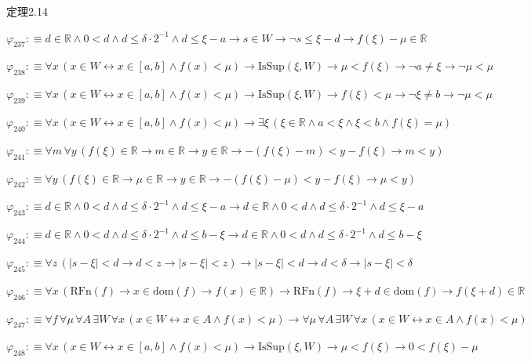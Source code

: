 \begin{fullproof}{定理2.14}
\begin{abbrevlist}
\item $\varphi_{237} :\equiv d \in \mathbb{R} \land 0 < d \land d \leq \delta \cdot 2^{-1} \land d \leq \xi - a \to s \in W \to \neg s \leq \xi - d \to f(\xi) - \mu \in \mathbb{R}$
\item $\varphi_{238} :\equiv \forall x\,(x \in W \leftrightarrow x \in [a,b] \land f(x) < \mu) \to \mathrm{IsSup}(\xi,W) \to \mu < f(\xi) \to \neg a \neq \xi \to \neg \mu < \mu$
\item $\varphi_{239} :\equiv \forall x\,(x \in W \leftrightarrow x \in [a,b] \land f(x) < \mu) \to \mathrm{IsSup}(\xi,W) \to f(\xi) < \mu \to \neg \xi \neq b \to \neg \mu < \mu$
\item $\varphi_{240} :\equiv \forall x\,(x \in W \leftrightarrow x \in [a,b] \land f(x) < \mu) \to \exists \xi\,(\xi \in \mathbb{R} \land a < \xi \land \xi < b \land f(\xi) = \mu)$
\item $\varphi_{241} :\equiv \forall m\,\forall y\,(f(\xi) \in \mathbb{R} \to m \in \mathbb{R} \to y \in \mathbb{R} \to -(f(\xi) - m) < y - f(\xi) \to m < y)$
\item $\varphi_{242} :\equiv \forall y\,(f(\xi) \in \mathbb{R} \to \mu \in \mathbb{R} \to y \in \mathbb{R} \to -(f(\xi) - \mu) < y - f(\xi) \to \mu < y)$
\item $\varphi_{243} :\equiv d \in \mathbb{R} \land 0 < d \land d \leq \delta \cdot 2^{-1} \land d \leq \xi - a \to d \in \mathbb{R} \land 0 < d \land d \leq \delta \cdot 2^{-1} \land d \leq \xi - a$
\item $\varphi_{244} :\equiv d \in \mathbb{R} \land 0 < d \land d \leq \delta \cdot 2^{-1} \land d \leq b - \xi \to d \in \mathbb{R} \land 0 < d \land d \leq \delta \cdot 2^{-1} \land d \leq b - \xi$
\item $\varphi_{245} :\equiv \forall z\,(\lvert s - \xi \rvert < d \to d < z \to \lvert s - \xi \rvert < z) \to \lvert s - \xi \rvert < d \to d < \delta \to \lvert s - \xi \rvert < \delta$
\item $\varphi_{246} :\equiv \forall x\,(\mathrm{RFn}(f) \to x \in \mathrm{dom}(f) \to f(x) \in \mathbb{R}) \to \mathrm{RFn}(f) \to \xi + d \in \mathrm{dom}(f) \to f(\xi + d) \in \mathbb{R}$
\item $\varphi_{247} :\equiv \forall f\,\forall \mu\,\forall A\,\exists W\,\forall x\,(x \in W \leftrightarrow x \in A \land f(x) < \mu) \to \forall \mu\,\forall A\,\exists W\,\forall x\,(x \in W \leftrightarrow x \in A \land f(x) < \mu)$
\item $\varphi_{248} :\equiv \forall x\,(x \in W \leftrightarrow x \in [a,b] \land f(x) < \mu) \to \mathrm{IsSup}(\xi,W) \to \mu < f(\xi) \to 0 < f(\xi) - \mu$

\end{abbrevlist}
\end{fullproof}
